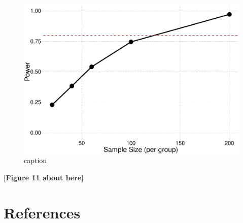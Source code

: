 \documentclass[
  man,floatsintext]{apa6}
\begin{document}
\normalsize

\scriptsize

\begin{figure}

{\centering \includegraphics{paper_files/figure-latex/fig-power-curve-1} 

}

\caption{caption}\label{fig:fig-power-curve}
\end{figure}

\begin{center}\textbf{[Figure 11 about here]} \end{center}

\normalsize

\newpage

\section{References}\label{references}
\end{document}
